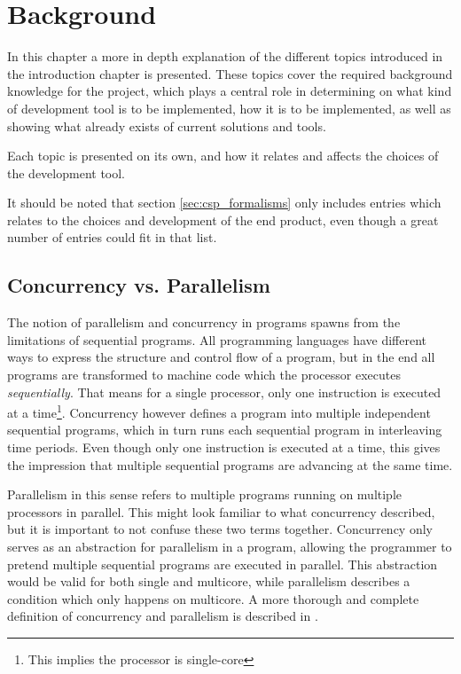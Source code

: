 
\chapter{Background}
\label{ch:background}

In this chapter a more in depth explanation of the different topics introduced in the introduction chapter is presented. These topics cover the required background knowledge for the project, which plays a central role in determining on what kind of development tool is to be implemented, how it is to be implemented, as well as showing what already exists of current solutions and tools.

Each topic is presented on its own, and how it relates and affects the choices of the development tool.

It should be noted that section \ref{sec:csp_formalisms} only includes entries which relates to the choices and development of the end product, even though a great number of entries could fit in that list.

\section{Concurrency vs. Parallelism}
\label{sec:concurrencyvsparallelism}

The notion of parallelism and concurrency in programs spawns from the limitations of sequential programs. All programming languages have different ways to express the structure and control flow of a program, but in the end all programs are transformed to machine code which the processor executes \textit{sequentially}. That means for a single processor, only one instruction is executed at a time\footnote{This implies the processor is single-core}. Concurrency however defines a program into multiple independent sequential programs, which in turn runs each sequential program in interleaving time periods. Even though only one instruction is executed at a time, this gives the impression that multiple sequential programs are advancing at the same time.

Parallelism in this sense refers to multiple programs running on multiple processors in parallel. This might look familiar to what concurrency described, but it is important to not confuse these two terms together. Concurrency only serves as an abstraction for parallelism in a program, allowing the programmer to pretend multiple sequential programs are executed in parallel. This abstraction would be valid for both single and multicore, while parallelism describes a condition which only happens on multicore. A more thorough and complete definition of concurrency and parallelism is described in \citet{benari2006}.


